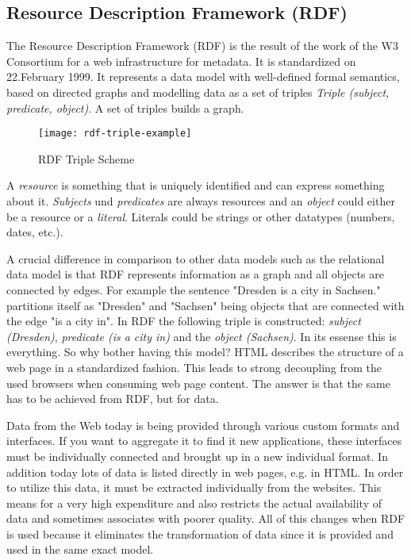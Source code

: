 \subsection{Resource Description Framework (RDF)}
The Resource Description Framework (RDF) is the result of the work of the W3 Consortium for a web infrastructure for metadata. It is standardized on 22.February 1999. It represents a data model with well-defined formal semantics, based on directed graphs and modelling data as a set of triples \textit{Triple (subject, predicate, object)}. A set of triples builds a graph.
\begin{figure}[h!]
    \texttt{[image: rdf-triple-example]}
    \caption{RDF Triple Scheme}
    \label{fig:view}
\end{figure}

A \textit{resource} is something that is uniquely identified and can express something about it. \textit{Subjects} und \textit{predicates} are always resources and an \textit{object} could either be a resource or a \textit{literal}. Literals could be strings or other datatypes (numbers, dates, etc.).

A crucial difference in comparison to other data models such as the relational data model is that RDF represents information as a graph and all objects are connected by edges. For example the sentence "Dresden is a city in Sachsen." partitions itself as "Dresden" and "Sachsen" being objects that are connected with the edge "is a city in". In RDF the following triple is constructed: \textit{subject (Dresden)}, \textit{predicate (is a city in)} and the \textit{object (Sachsen)}. In its essense this is everything. So why bother having this model? HTML describes the structure of a web page in a standardized fashion. This leads to strong decoupling from the used browsers when consuming web page content. The answer is that the same has to be achieved from RDF, but for data.

Data from the Web today is being provided through various custom formats and interfaces. If you want to aggregate it to find it new applications, these interfaces must be individually connected and brought up in a new individual format. In addition today lots of data is listed directly in web pages, e.g. in HTML. In order to utilize this data, it must be extracted individually from the websites. This means for a very high expenditure and also restricts the actual availability of data and sometimes associates with poorer quality. All of this changes when RDF is used because it eliminates the transformation of data since it is provided and used in the same exact model.

